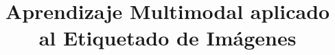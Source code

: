 \documentclass[12pt]{book}
\begin{document}









\title{Aprendizaje Multimodal aplicado al Etiquetado de Imágenes}
\end{document}
